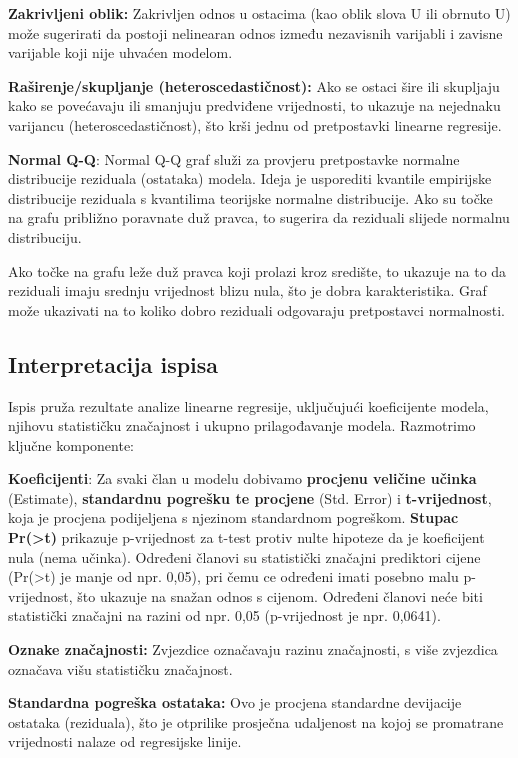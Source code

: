 \documentclass[
]{article}
\begin{document}
\textbf{Zakrivljeni oblik:} Zakrivljen odnos u ostacima (kao oblik slova
U ili obrnuto U) može sugerirati da postoji nelinearan odnos između
nezavisnih varijabli i zavisne varijable koji nije uhvaćen modelom.

\textbf{Raširenje/skupljanje (heteroscedastičnost):} Ako se ostaci šire
ili skupljaju kako se povećavaju ili smanjuju predviđene vrijednosti, to
ukazuje na nejednaku varijancu (heteroscedastičnost), što krši jednu od
pretpostavki linearne regresije.

\textbf{Normal Q-Q}: Normal Q-Q graf služi za provjeru pretpostavke
normalne distribucije reziduala (ostataka) modela. Ideja je usporediti
kvantile empirijske distribucije reziduala s kvantilima teorijske
normalne distribucije. Ako su točke na grafu približno poravnate duž
pravca, to sugerira da reziduali slijede normalnu distribuciju.

Ako točke na grafu leže duž pravca koji prolazi kroz središte, to
ukazuje na to da reziduali imaju srednju vrijednost blizu nula, što je
dobra karakteristika. Graf može ukazivati na to koliko dobro reziduali
odgovaraju pretpostavci normalnosti.

\subsection{Interpretacija ispisa}\label{interpretacija-ispisa}

Ispis pruža rezultate analize linearne regresije, uključujući
koeficijente modela, njihovu statističku značajnost i ukupno
prilagođavanje modela. Razmotrimo ključne komponente:

\textbf{Koeficijenti}: Za svaki član u modelu dobivamo \textbf{procjenu
veličine učinka} (Estimate), \textbf{standardnu pogrešku te procjene}
(Std. Error) i \textbf{t-vrijednost}, koja je procjena podijeljena s
njezinom standardnom pogreškom. \textbf{Stupac
Pr(\textgreater\textbar t\textbar)} prikazuje p-vrijednost za t-test
protiv nulte hipoteze da je koeficijent nula (nema učinka). Određeni
članovi su statistički značajni prediktori cijene
(Pr(\textgreater\textbar t\textbar) je manje od npr. 0,05), pri čemu ce
određeni imati posebno malu p-vrijednost, što ukazuje na snažan odnos s
cijenom. Određeni članovi neće biti statistički značajni na razini od
npr. 0,05 (p-vrijednost je npr. 0,0641).

\textbf{Oznake značajnosti:} Zvjezdice označavaju razinu značajnosti, s
više zvjezdica označava višu statističku značajnost.

\textbf{Standardna pogreška ostataka:} Ovo je procjena standardne
devijacije ostataka (reziduala), što je otprilike prosječna udaljenost
na kojoj se promatrane vrijednosti nalaze od regresijske linije.
\end{document}

